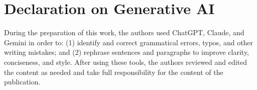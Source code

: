 \section*{Declaration on Generative AI}
During the preparation of this work, the authors used ChatGPT, Claude, and Gemini in
order to: (1) identify and correct grammatical errors, typos, and other writing
mistakes; and (2) rephrase sentences and paragraphs to improve clarity, conciseness,
and style. After using these tools, the authors reviewed and edited the content as
needed and take full responsibility for the content of the publication.
